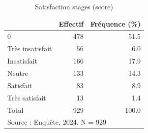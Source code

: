 \begin{table}[htbp]\centering
\def\sym#1{\ifmmode^{#1}\else\(^{#1}\)\fi}
\caption{Satisfaction stages (score)}
\begin{tabular}{l*{2}{r}}
\toprule
            &    Effectif&Fréquence (\%)\\
\midrule
0           &         478&        51.5\\
Très insatisfait&          56&         6.0\\
Insatisfait &         166&        17.9\\
Neutre      &         133&        14.3\\
Satisfait   &          83&         8.9\\
Très satisfait&          13&         1.4\\
Total       &         929&       100.0\\
\bottomrule
\multicolumn{3}{l}{\footnotesize Source : Enquête, 2024. N = 929}\\
\end{tabular}
\end{table}
